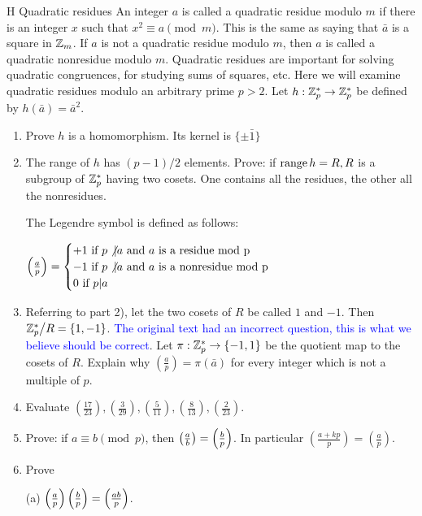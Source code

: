 \begin{exercise}{H Quadratic residues}
An integer $a$ is called a quadratic residue modulo $m$ if there is an integer $x$ such that $x^{2}\equiv a\pmod{m}$. This is the same as saying that $\bar{a}$ is a square in $\mathbb{Z}_{m}$. If $a$ is not a quadratic residue modulo $m$, then $a$ is called a quadratic nonresidue modulo $m$. Quadratic residues are important for solving quadratic congruences, for studying sums of squares, etc. Here we will examine quadratic residues modulo an arbitrary prime $p>2$. Let $h:\mathbb{Z}^{*}_{p}\rightarrow \mathbb{Z}^{*}_{p}$ be defined by $h(\bar{a})=\bar{a}^{2}$.
 \begin{enumerate}
     \item Prove $h$ is a homomorphism. Its kernel is $\{\pm\bar{1}\}$
     \item The range of $h$ has $(p-1)/2$ elements. Prove: if $\operatorname*{range} h=R, R$ is a subgroup of $\mathbb{Z}^{*}_{p}$ having two cosets. One contains all the residues, the other all the nonresidues.

     The Legendre symbol is defined as follows: 
     
     $\left(\frac{a}{p}\right)=\begin{cases}
         +1\ \text{if}\ p\not\vert a\ \text{and $a$ is a residue mod p}\\
         -1\ \text{if}\ p\not\vert a\ \text{and $a$ is a nonresidue mod p}\\
         0\ \text{if}\ p\vert a\
     \end{cases}$
     \item Referring to part 2), let the two cosets of $R$ be called $1$ and $-1$. Then ${\textstyle \mathbb{Z}^{*}_{p}}\big/{\textstyle R}=\{1,-1\}$. \textcolor{blue}{The original text had an incorrect question, this is what we believe should be correct}. Let $\pi:\mathbb{Z}^{*}_{p}\rightarrow\{-1,1\}$ be the quotient map to the cosets of $R$. Explain why $\left(\frac{a}{p}\right)=\pi(\bar{a})$ for every integer which is not a multiple of $p$.
     \item Evaluate $\left(\frac{17}{23}\right), \left(\frac{3}{29}\right), \left(\frac{5}{11}\right), \left(\frac{8}{13}\right), \left(\frac{2}{23}\right)$.
     \item Prove: if $a\equiv b\pmod{p}$, then $\left( \frac{a}{b}\right)=\left( \frac{b}{p}\right)$. In particular $\left(\frac{a+kp}{p}\right)=\left(\frac{a}{p}\right)$.
     \item Prove 

     (a) $\left( \frac{a}{p}\right)\left( \frac{b}{p}\right)=\left( \frac{ab}{p}\right)$.


\end{enumerate}
\end{exercise}
